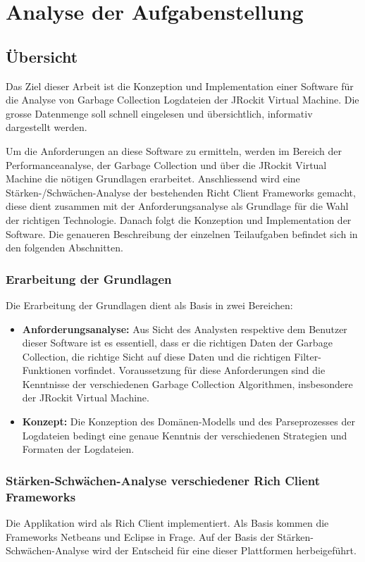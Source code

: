 \chapter{Analyse der Aufgabenstellung}\label{analyse_aufgabenstellung}
\section{Übersicht}
Das Ziel dieser Arbeit ist die Konzeption und Implementation einer Software für die Analyse von Garbage Collection Logdateien der JRockit Virtual Machine. Die grosse Datenmenge soll schnell eingelesen und übersichtlich, informativ dargestellt werden. 

Um die Anforderungen an diese Software zu ermitteln, werden im Bereich der Performanceanalyse, der Garbage Collection und über die JRockit Virtual Machine die nötigen Grundlagen erarbeitet. Anschliessend wird eine Stärken-/Schwächen-Analyse der bestehenden Richt Client Frameworks gemacht, diese dient zusammen mit der Anforderungsanalyse als Grundlage für die Wahl der richtigen Technologie. Danach folgt die Konzeption und Implementation der Software. Die genaueren Beschreibung der einzelnen Teilaufgaben befindet sich in den folgenden Abschnitten.

\subsection{Erarbeitung der Grundlagen}
Die Erarbeitung der Grundlagen dient als Basis in zwei Bereichen:
\begin{itemize}
	\item \textbf{Anforderungsanalyse:} Aus Sicht des Analysten respektive dem Benutzer dieser Software ist es essentiell, dass er die richtigen Daten der Garbage Collection, die richtige Sicht auf diese Daten und die richtigen Filter-Funktionen vorfindet. Voraussetzung für diese Anforderungen sind die Kenntnisse der verschiedenen Garbage Collection Algorithmen, insbesondere der JRockit Virtual Machine. 
	\item \textbf{Konzept: } Die Konzeption des Domänen-Modells und des Parseprozesses der Logdateien bedingt eine genaue Kenntnis der verschiedenen Strategien und Formaten der Logdateien.
\end{itemize}

\subsection{Stärken-Schwächen-Analyse verschiedener Rich Client Frameworks}
Die Applikation wird als Rich Client implementiert. Als Basis kommen die Frameworks Netbeans und Eclipse in Frage. Auf der Basis der Stärken-Schwächen-Analyse wird der Entscheid für eine dieser Plattformen herbeigeführt.

